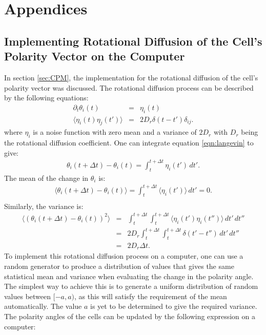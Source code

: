 \documentclass[a4paper,12pt]{article}
\newcommand{\inc}{\Delta}
\begin{document}
   


\appendix
\section{Appendices}
\subsection{Implementing Rotational Diffusion of the Cell's Polarity Vector on the Computer}
\label{app:rotatediff}
In section \ref{sec:CPM}, the implementation for the rotational diffusion of the cell's polarity vector was discussed. The rotational diffusion process can be described by the following equations:
\begin{eqnarray}
\partial_t\theta_i(t) & = & \eta_i(t)\label{eqn:langevin}\\
\langle{\eta_i(t)\eta_j(t')\rangle} & = & 2D_r\delta(t-t')\delta_{ij}.
\end{eqnarray}
where $\eta_i$ is a noise function with zero mean and a variance of $2D_r$ with $D_r$ being the rotational diffusion coefficient. One can integrate equation \ref{eqn:langevin} to give:
\begin{eqnarray}
\theta_i(t+\inc t) - \theta_i(t) = \int_{t}^{t+\inc t} \eta_i (t')\,dt'.
\end{eqnarray}
The mean of the change in $\theta_i$ is:
\begin{eqnarray}
\langle\theta_i(t+\inc t) - \theta_i(t)\rangle = \int_{t}^{t+\inc t} \langle\eta_i (t')\rangle\,dt' = 0.\\
\end{eqnarray}
Similarly, the variance is:
\begin{eqnarray}
\langle\left(\theta_i(t+\inc t) - \theta_i(t)\right)^2\rangle & = & \int_{t}^{t+\inc t}\int_{t}^{t+\inc t} \langle\eta_i (t')\eta_i(t'')\rangle\,dt'\,dt''\\
& = & 2D_r \int_{t}^{t+\inc t}\int_{t}^{t+\inc t} \delta(t'-t'')\,dt'\,dt''\\
& = & 2D_r\inc t\label{eqn:anglevar}.
\end{eqnarray}
To implement this rotational diffusion process on a computer, one can use a random generator to produce a distribution of values that gives the same statistical mean and variance when evaluating the change in the polarity angle. The simplest way to achieve this is to generate a uniform distribution of random values between $[-a,a)$, as this will satisfy the requirement of the mean automatically. The value $a$ is yet to be determined to give the required variance. The polarity angles of the cells can be updated by the following expression on a computer:
\end{document}
